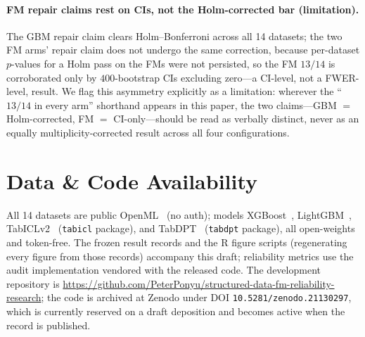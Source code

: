 \documentclass[11pt]{article}
\begin{document}
\paragraph{FM repair claims rest on CIs, not the Holm-corrected bar (limitation).} The GBM repair claim
clears Holm--Bonferroni across all 14 datasets; the two FM arms' repair claim does not undergo the same
correction, because per-dataset $p$-values for a Holm pass on the FMs were not persisted, so the FM $13/14$
is corroborated only by $400$-bootstrap CIs excluding zero---a CI-level, not a FWER-level, result. We flag
this asymmetry explicitly as a limitation: wherever the ``$13/14$ in every arm'' shorthand appears in this
paper, the two claims---GBM $=$ Holm-corrected, FM $=$ CI-only---should be read as verbally distinct, never
as an equally multiplicity-corrected result across all four configurations.

\section*{Data \& Code Availability}
All 14 datasets are public OpenML~\citep{vanschoren2014openml} (no auth); models XGBoost~\citep{chen2016xgboost},
LightGBM~\citep{ke2017lightgbm}, TabICLv2~\citep{qu2026tabicl} (\texttt{tabicl} package), and
TabDPT~\citep{ma2024tabdpt} (\texttt{tabdpt} package), all open-weights and token-free. The frozen result
records and the R figure scripts (regenerating every figure from those records) accompany this draft;
reliability metrics use the audit implementation vendored with the released code. The development repository is
\url{https://github.com/PeterPonyu/structured-data-fm-reliability-research}; the code is archived at Zenodo
under DOI \texttt{10.5281/zenodo.21130297}, which is currently reserved on a draft deposition and becomes
active when the record is published.



\end{document}
